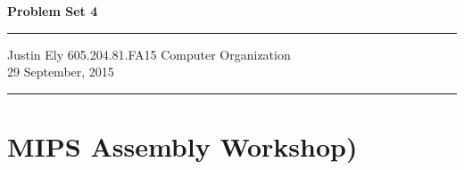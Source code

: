 \documentclass[a4paper,11pt]{article}
\begin{document}
\begin{flushright}

\vspace{1.1cm}

{\bf\Huge Problem Set 4}

\rule{0.25\linewidth}{0.5pt}

\vspace{0.5cm}
Justin Ely
\linebreak
\newline
\footnotesize{605.204.81.FA15 Computer Organization\\}
\vspace{0.5cm}
29 September, 2015
\end{flushright}

\noindent\rule{\linewidth}{1.0pt}



\section*{MIPS Assembly Workshop)}
\end{document}
